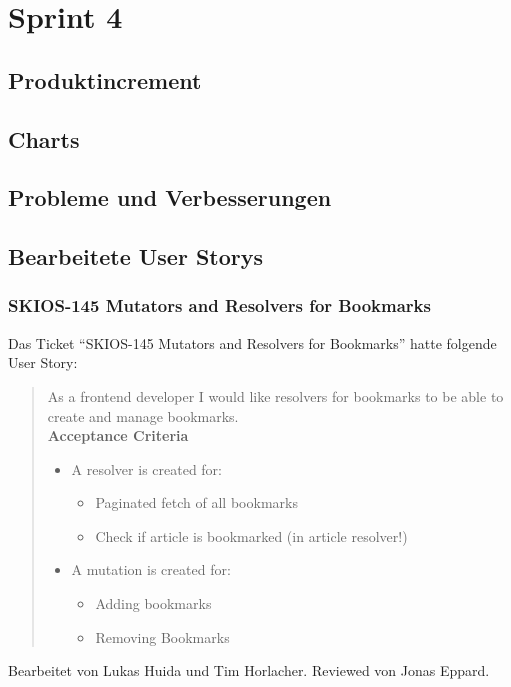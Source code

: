 \section{Sprint 4}
\subsection{Produktincrement}
\subsection{Charts}
\subsection{Probleme und Verbesserungen}

\subsection{Bearbeitete User Storys}
\subsubsection{SKIOS-145 Mutators and Resolvers for Bookmarks}
Das Ticket \enquote{SKIOS-145 Mutators and Resolvers for Bookmarks} hatte folgende User Story:
\begin{quotation}
    As a frontend developer I would like resolvers for bookmarks to be able to create and manage bookmarks. \\
\textbf{Acceptance Criteria}
\begin{itemize}
    \item A resolver is created for:
    \begin{itemize}
        \item Paginated fetch of all bookmarks
        \item Check if article is bookmarked (in article resolver!)
    \end{itemize}
    \item A mutation is created for:
    \begin{itemize}
        \item Adding bookmarks
        \item Removing Bookmarks
    \end{itemize}
\end{itemize}
\end{quotation}
Bearbeitet von Lukas Huida und Tim Horlacher.
Reviewed von Jonas Eppard.

